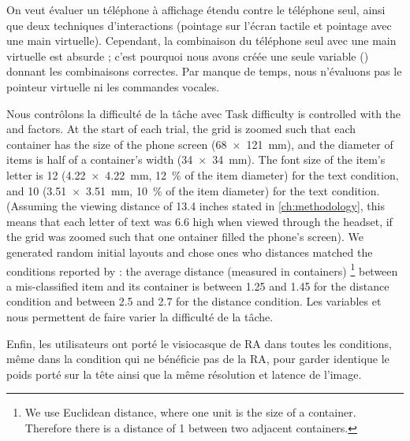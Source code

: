 On veut évaluer un téléphone à affichage étendu contre le téléphone seul, ainsi que deux techniques d'interactions (pointage sur l'écran tactile et pointage avec une main virtuelle). Cependant, la combinaison du téléphone seul avec une main virtuelle est absurde ; c'est pourquoi nous avons créée une seule variable () donnant les combinaisons correctes. Par manque de temps, nous n'évaluons pas le pointeur virtuelle ni les commandes vocales. 

Nous contrôlons la difficulté de la tâche avec
Task difficulty is controlled with the  and  factors. At the start of each trial, the grid is zoomed such that each container has the size of the phone screen (\SI{68x121}{\mm}), and the diameter of items is half of a container's width (\SI{34x34}{\mm}). The font size of the item's letter is \SI{12}{\pt} (\SI{4.22x4.22}{\mm}, \SI{12}{\percent} of the item diameter) for the  text condition, and \SI{10}{\pt} (\SI{3.51x3.51}{\mm}, \SI{10}{\percent} of the item diameter) for the  text condition. (Assuming the viewing distance of 13.4 inches stated in \autoref{ch:methodology}, this means that each letter of  text was \SI{6.6}{\px} high when viewed through the headset, if the grid was zoomed such that one ontainer filled the phone's screen). We generated random initial layouts and chose ones who distances matched the conditions reported by \cite{Liu2014}: the average distance (measured in containers) \footnote{We use Euclidean distance, where one unit is the size of a container. Therefore there is a distance of 1 between two adjacent containers.} %
between a mis-classified item and its container is between 1.25 and 1.45 for the  distance condition and between 2.5 and 2.7 for the  distance condition.
Les variables  et  nous permettent de faire varier la difficulté de la tâche.

Enfin, les utilisateurs ont porté le visiocasque de RA  dans toutes les conditions, même dans la condition  qui ne bénéficie pas de la RA, pour garder identique le poids porté sur la tête ainsi que la même résolution et latence de l'image.

